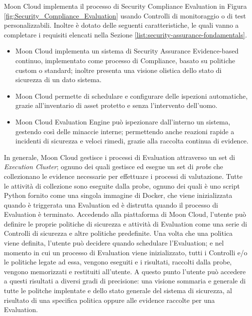 Moon Cloud implementa il processo di Security Compliance Evaluation in Figura \ref{fig:Security_Compliance_Evaluation} usando Controlli 
di monitoraggio o di test personalizzabili. Inoltre è dotato delle seguenti caratteristiche, le quali vanno a completare i requisiti 
elencati nella Sezione \ref{list:security-assurance-fondamentals}.
\begin{itemize}
    \item Moon Cloud implementa un sistema di Security Assurance Evidence-based continuo, implementato come processo di Compliance,
    basato su politiche custom o standard; inoltre presenta una visione olistica dello stato di sicurezza di un dato sistema.
    \item Moon Cloud permette di schedulare e configurare delle ispezioni automatiche, grazie all'inventario di asset protetto e senza
    l'intervento dell'uomo.
    \item Moon Cloud Evaluation Engine può ispezionare dall'interno un sistema, gestendo così delle minaccie interne; permettendo anche 
    reazioni rapide a incidenti di sicurezza e veloci rimedi, grazie alla raccolta continua di evidence.
\end{itemize}
In generale, Moon Cloud gestisce i processi di Evaluation attraverso un set di \textit{Execution Cluster}; ognuno dei quali gestisce 
ed esegue un set di \textit{probe} che collezionano le evidence necessarie per effettuare i processi di valutazione. 
Tutte le attività di collezione sono eseguite dalla probe, ognuno dei quali è uno script Python fornito come una singola immagine di Docker, 
che viene inizializzata quando è triggerata una Evaluation ed è distrutta quando il processo di Evaluation è terminato.\hfill\break
Accedendo alla piattaforma di Moon Cloud, l'utente può definire le proprie politiche di sicurezza e attività di Evaluation come 
una serie di Controlli di sicurezza e altre politiche predefinite. Una volta che una politica viene definita, l'utente può 
decidere quando schedulare l'Evaluation; e nel momento in cui un processo di Evaluation viene inizializzato, tutti i Controlli e/o le 
politiche legate ad essa, vengono eseguiti e i risultati, raccolti dalla probe, vengono memorizzati e restituiti all'utente. 
A questo punto l'utente può accedere a questi risultati a diversi gradi di precisione: una visione sommaria e generale di tutte le 
politche implentate e dello stato generale del sistema di sicurezza, al risultato di una specifica politica oppure alle evidence 
raccolte per una Evaluation.\hfill\break
%
\vspace{0.5 cm}
